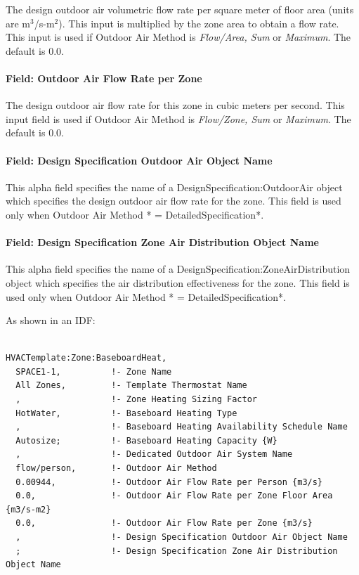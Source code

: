 The design outdoor air volumetric flow rate per square meter of floor area (units are m\(^{3}\)/s-m\(^{2}\)). This input is multiplied by the zone area to obtain a flow rate. This input is used if Outdoor Air Method is \emph{Flow/Area, Sum} or \emph{Maximum}. The default is 0.0.

\paragraph{Field: Outdoor Air Flow Rate per Zone}\label{field-outdoor-air-flow-rate-per-zone-1}

The design outdoor air flow rate for this zone in cubic meters per second. This input field is used if Outdoor Air Method is \emph{Flow/Zone, Sum} or \emph{Maximum}. The default is 0.0.

\paragraph{Field: Design Specification Outdoor Air Object Name}\label{field-design-specification-outdoor-air-object-name-1-000}

This alpha field specifies the name of a DesignSpecification:OutdoorAir object which specifies the design outdoor air flow rate for the zone. This field is used only when Outdoor Air Method * = DetailedSpecification*.

\paragraph{Field: Design Specification Zone Air Distribution Object Name}\label{field-design-specification-zone-air-distribution-object-name-000}

This alpha field specifies the name of a DesignSpecification:ZoneAirDistribution object which specifies the air distribution effectiveness for the zone. This field is used only when Outdoor Air Method * = DetailedSpecification*.

As shown in an IDF:

\begin{lstlisting}

HVACTemplate:Zone:BaseboardHeat,
  SPACE1-1,          !- Zone Name
  All Zones,         !- Template Thermostat Name
  ,                  !- Zone Heating Sizing Factor
  HotWater,          !- Baseboard Heating Type
  ,                  !- Baseboard Heating Availability Schedule Name
  Autosize;          !- Baseboard Heating Capacity {W}
  ,                  !- Dedicated Outdoor Air System Name
  flow/person,       !- Outdoor Air Method
  0.00944,           !- Outdoor Air Flow Rate per Person {m3/s}
  0.0,               !- Outdoor Air Flow Rate per Zone Floor Area {m3/s-m2}
  0.0,               !- Outdoor Air Flow Rate per Zone {m3/s}
  ,                  !- Design Specification Outdoor Air Object Name
  ;                  !- Design Specification Zone Air Distribution Object Name
\end{lstlisting}

